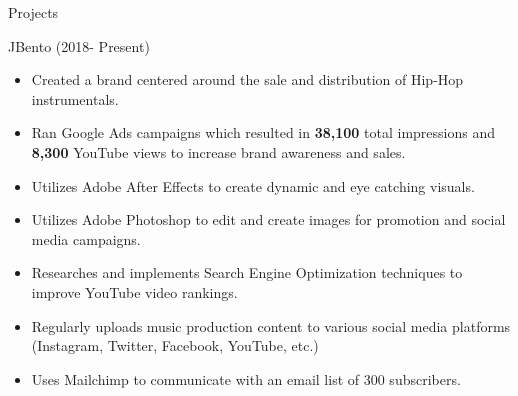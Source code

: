 \documentclass[]{johnsoncv}
\begin{document}
	\begin{cvsection}{Projects}
		\begin{cvsubsection}{JBento (2018- Present)}{}{}
			\begin{itemize}
				\item Created a brand centered around the sale and distribution of Hip-Hop instrumentals.
				\item Ran Google Ads campaigns which resulted in \textbf{38,100} total impressions and \textbf{8,300} YouTube views to increase brand awareness and sales.
				\item Utilizes Adobe After Effects to create dynamic and eye catching visuals.
				\item Utilizes Adobe Photoshop to edit and create images for promotion and social media campaigns.
				\item Researches and implements Search Engine Optimization techniques to improve YouTube video rankings.
				\item Regularly uploads music production content to various social media platforms (Instagram, Twitter, Facebook, YouTube, etc.)
				\item Uses Mailchimp to communicate with an email list of 300 subscribers.
			\end{itemize}
	\end{cvsubsection}

	\end{cvsection}
	
\end{document}
